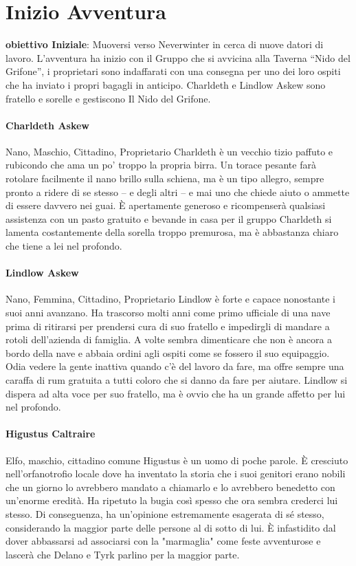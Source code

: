 \documentclass{article}
\begin{document}
\section{Inizio Avventura}

\textbf{obiettivo Iniziale}: Muoversi verso Neverwinter in cerca di nuove datori di lavoro.
L’avventura ha inizio con il Gruppo che si avvicina alla Taverna “Nido del Grifone”, i proprietari sono indaffarati con una consegna per uno dei loro ospiti che ha inviato i propri bagagli in anticipo.
Charldeth e Lindlow Askew sono fratello e sorelle e gestiscono Il Nido del Grifone. 
\paragraph{Charldeth Askew}
Nano, Maschio, Cittadino, Proprietario
Charldeth è un vecchio tizio paffuto e rubicondo che ama un po' troppo la propria birra. Un torace pesante farà rotolare facilmente il nano brillo sulla schiena, ma è un tipo allegro, sempre pronto a ridere di se stesso – e degli altri – e mai uno che chiede aiuto o ammette di essere davvero nei guai. È apertamente generoso e ricompenserà qualsiasi assistenza con un pasto gratuito e bevande in casa per il gruppo
Charldeth si lamenta costantemente della sorella troppo premurosa, ma è abbastanza chiaro che tiene a lei nel profondo.

\paragraph{Lindlow Askew }
Nano, Femmina, Cittadino, Proprietario
Lindlow è forte e capace nonostante i suoi anni avanzano. Ha trascorso molti anni come primo ufficiale di una nave prima di ritirarsi per prendersi cura di suo fratello e impedirgli di mandare a rotoli dell'azienda di famiglia.
A volte sembra dimenticare che non è ancora a bordo della nave e abbaia ordini agli ospiti come se fossero il suo equipaggio. Odia vedere la gente inattiva quando c'è del lavoro da fare, ma offre sempre una caraffa di rum gratuita a tutti coloro che si danno da fare per aiutare.
Lindlow si dispera ad alta voce per suo fratello, ma è ovvio che ha un grande affetto per lui nel profondo.
\paragraph{Higustus Caltraire} Elfo, maschio, cittadino comune
Higustus è un uomo di poche parole. È cresciuto nell'orfanotrofio locale dove ha inventato la storia che i suoi genitori erano nobili che un giorno lo avrebbero mandato a chiamarlo e lo avrebbero benedetto con un'enorme eredità. Ha ripetuto la bugia così spesso che ora sembra crederci lui stesso. Di conseguenza, ha un'opinione estremamente esagerata di sé stesso, considerando la maggior parte delle persone al di sotto di lui.
È infastidito dal dover abbassarsi ad associarsi con la "marmaglia" come feste avventurose e lascerà che Delano e Tyrk parlino per la maggior parte.
\end{document}

